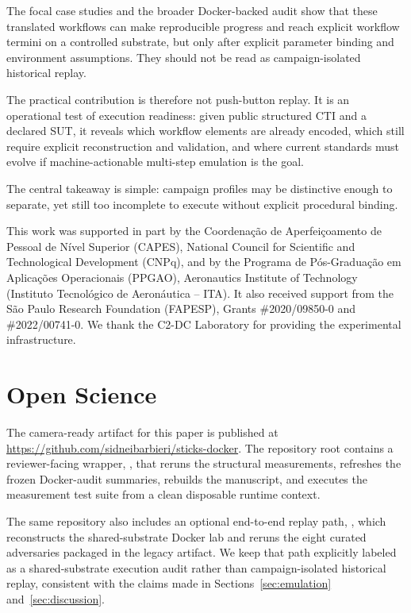 \documentclass[sigconf]{acmart}
\begin{document}
The focal case studies and the broader Docker-backed audit show that these translated workflows can make reproducible progress and reach explicit workflow termini on a controlled substrate, but only after explicit parameter binding and environment assumptions. They should not be read as campaign-isolated historical replay.

The practical contribution is therefore not push-button replay. It is an operational test of execution readiness: given public structured CTI and a declared SUT, it reveals which workflow elements are already encoded, which still require explicit reconstruction and validation, and where current standards must evolve if machine-actionable multi-step emulation is the goal.

The central takeaway is simple: campaign profiles may be distinctive enough to separate, yet still too incomplete to execute without explicit procedural binding.

\begin{acks}
This work was supported in part by the Coordenação de Aperfeiçoamento de Pessoal de Nível Superior (CAPES), National Council for Scientific and Technological Development (CNPq), and by the Programa de Pós-Graduação em Aplicações Operacionais (PPGAO), Aeronautics Institute of Technology (Instituto Tecnológico de Aeronáutica – ITA). It also received support from the São Paulo Research Foundation (FAPESP), Grants \#2020/09850-0 and \#2022/00741-0. We thank the C2-DC Laboratory for providing the experimental infrastructure.
\end{acks}




\appendix

\section{Open Science}\label{sec:open_science}

The camera-ready artifact for this paper is published at \url{https://github.com/sidneibarbieri/sticks-docker}. The repository root contains a reviewer-facing wrapper, , that reruns the structural measurements, refreshes the frozen Docker-audit summaries, rebuilds the manuscript, and executes the measurement test suite from a clean disposable runtime context.

The same repository also includes an optional end-to-end replay path, , which reconstructs the shared-substrate Docker lab and reruns the eight curated adversaries packaged in the legacy artifact. We keep that path explicitly labeled as a shared-substrate execution audit rather than campaign-isolated historical replay, consistent with the claims made in Sections~\ref{sec:emulation} and~\ref{sec:discussion}.
\end{document}
